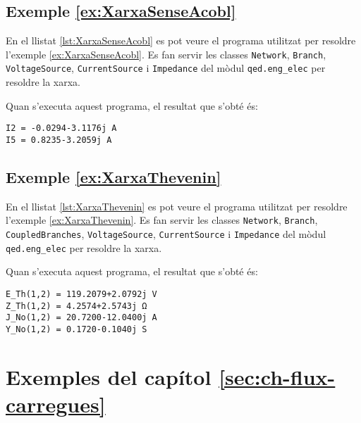 \hypertarget{exemple:XarxaSenseAcobl}{\subsection{Exemple \ref*{ex:XarxaSenseAcobl} \XarxaSenseAcobl}}
En el llistat \vref{lst:XarxaSenseAcobl} es pot veure el programa utilitzat per resoldre l'exemple \vref{ex:XarxaSenseAcobl}. Es fan servir les classes \texttt{Network},  \texttt{Branch}, \texttt{VoltageSource}, \texttt{CurrentSource} i \texttt{Impedance} del mòdul \texttt{qed.eng\_elec} per resoldre la xarxa.


Quan s'executa aquest programa, el resultat que s'obté és:
\lstset{
	language=,
	numbers=none,
	frame=none
}
\begin{lstlisting}
I2 = -0.0294-3.1176j A
I5 = 0.8235-3.2059j A
\end{lstlisting} 

\hypertarget{exemple:XarxaThevenin}{\subsection{Exemple \ref*{ex:XarxaThevenin} \XarxaThevenin}}
En el llistat \vref{lst:XarxaThevenin} es pot veure el programa utilitzat per resoldre l'exemple \vref{ex:XarxaThevenin}. Es fan servir les classes \texttt{Network}, \texttt{Branch}, \texttt{CoupledBranches}, \texttt{VoltageSource}, \texttt{CurrentSource} i \texttt{Impedance} del mòdul \texttt{qed.eng\_elec} per resoldre la xarxa.


Quan s'executa aquest programa, el resultat que s'obté és:
\lstset{
	language=,
	numbers=none,
	frame=none
}
\begin{lstlisting}
E_Th(1,2) = 119.2079+2.0792j V
Z_Th(1,2) = 4.2574+2.5743j Ω
J_No(1,2) = 20.7200-12.0400j A
Y_No(1,2) = 0.1720-0.1040j S
\end{lstlisting} 



\section{Exemples del capítol \ref*{sec:ch-flux-carregues}}

